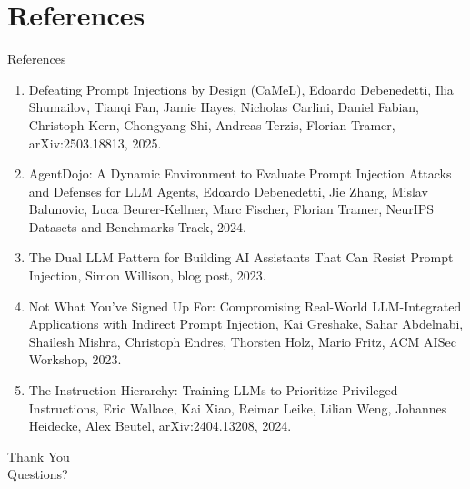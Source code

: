 \documentclass[10pt]{beamer}
\begin{document}
\section{References}
\begin{frame}[allowframebreaks]{References}
  \footnotesize
  \begin{enumerate}
    \item Defeating Prompt Injections by Design (CaMeL), Edoardo Debenedetti, Ilia Shumailov, Tianqi Fan, Jamie Hayes, Nicholas Carlini, Daniel Fabian, Christoph Kern, Chongyang Shi, Andreas Terzis, Florian Tramer, arXiv:2503.18813, 2025.
    \item AgentDojo: A Dynamic Environment to Evaluate Prompt Injection Attacks and Defenses for LLM Agents, Edoardo Debenedetti, Jie Zhang, Mislav Balunovic, Luca Beurer-Kellner, Marc Fischer, Florian Tramer, NeurIPS Datasets and Benchmarks Track, 2024.
    \item The Dual LLM Pattern for Building AI Assistants That Can Resist Prompt Injection, Simon Willison, blog post, 2023.
    \item Not What You've Signed Up For: Compromising Real-World LLM-Integrated Applications with Indirect Prompt Injection, Kai Greshake, Sahar Abdelnabi, Shailesh Mishra, Christoph Endres, Thorsten Holz, Mario Fritz, ACM AISec Workshop, 2023.
    \item The Instruction Hierarchy: Training LLMs to Prioritize Privileged Instructions, Eric Wallace, Kai Xiao, Reimar Leike, Lilian Weng, Johannes Heidecke, Alex Beutel, arXiv:2404.13208, 2024.
  \end{enumerate}
\end{frame}

\begin{frame}[plain]
  \begin{center}
    {\Huge Thank You}\\[1em]
    {\large Questions?}
  \end{center}
\end{frame}
\end{document}

